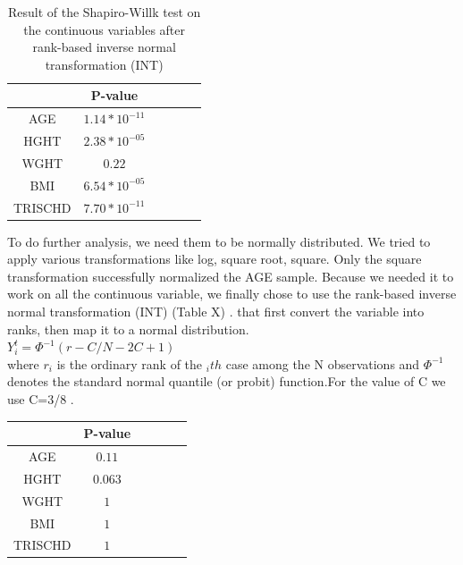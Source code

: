 \documentclass[a4paper, 11pt]{article}
\begin{document}
\begin{multicols}{2}
\begin{table}[H]
\begin{center}
	\setlength{\tabcolsep}{0.5pt}
	\begin{tabular}{ |c|c|c|c|c|c| } 
	\hline 
	& P-value   \\[0.2cm] 
	\hline
	 AGE &\small $1.14*10^{-11} $   \\ [0.1cm]
	\hline
	 HGHT &\small $2.38*10^{-05} $  \\[0.1cm]
	\hline
	 WGHT & \small $ 0.22 $  \\[0.1cm]
	\hline
	 BMI &   \small $6.54*10^{-05}  $ \\[0.1cm]
	\hline
	 TRISCHD &\small $7.70*10^{-11}$ \\[0.1cm]
	\hline
	 
\end{tabular}
\end{center}
\caption{Result of the Shapiro-Willk test on the continuous variables after rank-based inverse normal transformation (INT) }
\label{tab:Q2FC}
\end{table}






To do further analysis, we need them to be normally distributed. We tried to apply various transformations like log, square root, square. Only the square transformation successfully normalized the AGE sample. 
Because we needed it to work on all the continuous variable, we finally chose to use the rank-based inverse normal transformation (INT) (Table X)  . that first convert the variable into ranks, then map it to a normal distribution. 
\\

$ Y^t_{i}=  \Phi^{-1}(r-C/N-2C+1) $
\\

where $r_i$ is the ordinary rank of the $_ith$ case among the N observations and $\Phi^{-1}$ denotes the standard normal quantile (or probit) function.For the value of C we use C=3/8 \citep{beasley2009rank}.

\begin{table}[H]
\begin{center}
	\setlength{\tabcolsep}{0.5pt}
	\begin{tabular}{ |c|c|c|c|c|c| } 
	\hline 
	& P-value   \\[0.2cm] 
	\hline
	 AGE &\small $0.11 $   \\ [0.1cm]
	\hline
	 HGHT & \small $0.063 $ \\[0.1cm]
	\hline
	 WGHT & \small $ 1 $   \\[0.1cm]
	\hline
	 BMI &  \small $1 $\\[0.1cm]
	\hline
	 TRISCHD &\small $1$  \\[0.1cm]
	\hline
	 

\end{tabular}
\end{center}
\end{table}
\end{multicols}
\end{document}
